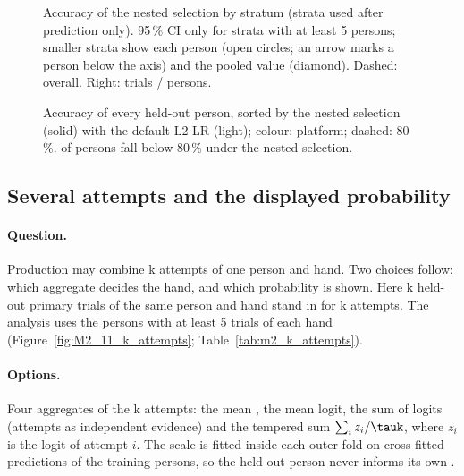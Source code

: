 \begin{figure}[tbp]
\centering
{}
\caption{Accuracy of the nested selection by stratum (strata used after prediction only). 95\,\% CI only for
strata with at least 5 persons; smaller strata show each person (open circles; an arrow marks a person below
the axis) and the pooled value (diamond). Dashed: overall. Right: trials / persons.}
\label{fig:M2_09_breakdown}\label{fig:app:m2-breakdown}
\end{figure}

\begin{figure}[tbp]
\centering
{}
\caption{Accuracy of every held-out person, sorted by the nested selection (solid) with the default L2 LR
(light); colour: platform; dashed: 80\,\%.  of  persons fall below 80\,\%
under the nested selection.}
\label{fig:M2_10_persons}\label{fig:app:m2-persons}
\end{figure}


\FloatBarrier
\subsection{Several attempts and the displayed probability}\label{app:m2:attempts}

\paragraph{Question.} Production may combine k attempts of one person and hand. Two choices follow: which
aggregate decides the hand, and which probability is shown. Here k held-out primary trials of the same person
and hand stand in for k attempts. The analysis uses the  persons with at least 5
trials of each hand (Figure~\ref{fig:M2_11_k_attempts}; Table~\ref{tab:m2_k_attempts}).

\paragraph{Options.} Four aggregates of the k attempts: the mean \pright, the mean logit, the sum of logits
(attempts as independent evidence) and the tempered sum $\sum_i z_i/\tauk$, where $z_i$ is the logit of attempt
$i$. The scale \tauk{} is fitted inside each outer fold on cross-fitted predictions of the training persons, so
the held-out person never informs its own \tauk.

